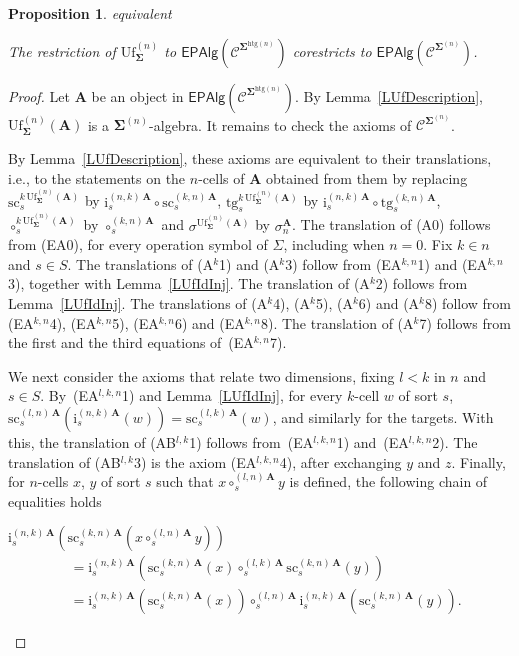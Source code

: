 \documentclass[a4paper, reqno]{amsbook}
\makeatletter
\newcommand{\sig}[1]{\mathbf{#1}}             %
\newcommand{\spec}[1]{\boldsymbol{\mathcal{#1}}} %
\newcommand{\htg}{\mathrm{htg}}                %
\newcommand{\src}{\mathrm{sc}}
\newcommand{\tgt}{\mathrm{tg}}
\newcommand{\Uf}{\mathrm{Uf}}
\theoremstyle{plain}
\newtheorem{proposition}[theorem]{Proposition}
\theoremstyle{definition}
\newcommand*{\CA@leanpending}{}
\newcommand*{\CA@leanrelation}{}
\newcommand*{\lean}[2]{%
  \ifcsname\string\color@lean@#1\endcsname\else
    \PackageError{main}{Unknown relation `#1' in \string\lean}{Use equivalent, weaker or stronger.}%
  \fi
  \gdef\CA@leanrelation{#1}%
  \gdef\CA@leanpending{#2}}
\makeatother
\begin{document}
\begin{proposition}\label{PUfEpVariety}\lean{equivalent}{Presentations.unification_isModel,Presentations.unificationModels}
The restriction of $\Uf^{(n)}_{\sig{\Sigma}}$ to $\mathsf{EPAlg}(\spec{C}^{\sig{\Sigma}^{\htg(n)}})$ corestricts to $\mathsf{EPAlg}(\spec{C}^{\sig{\Sigma}^{(n)}})$.
\end{proposition}
\begin{proof}
Let $\mathbf{A}$ be an object in $\mathsf{EPAlg}(\spec{C}^{\sig{\Sigma}^{\htg(n)}})$.
By Lemma~\ref{LUfDescription}, $\Uf^{(n)}_{\sig{\Sigma}}(\mathbf{A})$ is a $\sig{\Sigma}^{(n)}$-algebra.
It remains to check the axioms of $\spec{C}^{\sig{\Sigma}^{(n)}}$.

By Lemma~\ref{LUfDescription}, these axioms are equivalent to their translations, i.e., to the statements on the $n$-cells of $\mathbf{A}$ obtained from them by replacing $\src^{k\,\Uf^{(n)}_{\sig{\Sigma}}(\mathbf{A})}_{s}$ by $\mathrm{i}^{(n,k)\,\mathbf{A}}_{s}\circ\src^{(k,n)\,\mathbf{A}}_{s}$, $\tgt^{k\,\Uf^{(n)}_{\sig{\Sigma}}(\mathbf{A})}_{s}$ by $\mathrm{i}^{(n,k)\,\mathbf{A}}_{s}\circ\tgt^{(k,n)\,\mathbf{A}}_{s}$, $\circ^{k\,\Uf^{(n)}_{\sig{\Sigma}}(\mathbf{A})}_{s}$ by $\circ^{(k,n)\,\mathbf{A}}_{s}$ and $\sigma^{\Uf^{(n)}_{\sig{\Sigma}}(\mathbf{A})}$ by $\sigma_{n}^{\mathbf{A}}$.
The translation of (A0) follows from (EA0), for every operation symbol of $\Sigma$, including when $n=0$.
Fix $k\in n$ and $s\in S$.
The translations of (A$^{k}$1) and (A$^{k}$3) follow from (EA$^{k,n}$1) and (EA$^{k,n}$3), together with Lemma~\ref{LUfIdInj}.
The translation of (A$^{k}$2) follows from Lemma~\ref{LUfIdInj}.
The translations of (A$^{k}$4), (A$^{k}$5), (A$^{k}$6) and (A$^{k}$8) follow from (EA$^{k,n}$4), (EA$^{k,n}$5), (EA$^{k,n}$6) and (EA$^{k,n}$8).
The translation of (A$^{k}$7) follows from the first and the third equations of~(EA$^{k,n}$7).

We next consider the axioms that relate two dimensions, fixing $l<k$ in $n$ and $s\in S$.
By~(EA$^{l,k,n}$1) and Lemma~\ref{LUfIdInj}, for every $k$-cell $w$ of sort $s$, $\src^{(l,n)\,\mathbf{A}}_{s}(\mathrm{i}^{(n,k)\,\mathbf{A}}_{s}(w))=\src^{(l,k)\,\mathbf{A}}_{s}(w)$, and similarly for the targets.
With this, the translation of (AB$^{l,k}$1) follows from~(EA$^{l,k,n}$1) and~(EA$^{l,k,n}$2).
The translation of (AB$^{l,k}$3) is the axiom (EA$^{l,k,n}$4), after exchanging $y$ and $z$.
Finally, for $n$-cells $x$, $y$ of sort $s$ such that $x\circ^{(l,n)\,\mathbf{A}}_{s}y$ is defined, the following chain of equalities holds
\begin{flushleft}
$
\mathrm{i}^{(n,k)\,\mathbf{A}}_{s}\left(\src^{(k,n)\,\mathbf{A}}_{s}\left(x\circ^{(l,n)\,\mathbf{A}}_{s}y\right)\right)
$
\begin{align*}
&=
\mathrm{i}^{(n,k)\,\mathbf{A}}_{s}\left(\src^{(k,n)\,\mathbf{A}}_{s}(x)\circ^{(l,k)\,\mathbf{A}}_{s}\src^{(k,n)\,\mathbf{A}}_{s}(y)\right)
\tag{1}
\\&=
\mathrm{i}^{(n,k)\,\mathbf{A}}_{s}\left(\src^{(k,n)\,\mathbf{A}}_{s}(x)\right)\circ^{(l,n)\,\mathbf{A}}_{s}\mathrm{i}^{(n,k)\,\mathbf{A}}_{s}\left(\src^{(k,n)\,\mathbf{A}}_{s}(y)\right).
\tag{2}
\end{align*}
\end{flushleft}


\end{proof}
\end{document}
